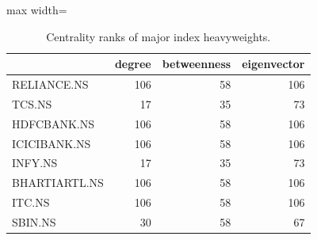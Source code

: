\begin{table}
\centering
\caption{Centrality ranks of major index heavyweights.}
\label{tab:heavyweights}
\begin{adjustbox}{max width=\textwidth}
\begin{tabular}{lrrr}
\toprule
 & degree & betweenness & eigenvector \\
\midrule
RELIANCE.NS & 106 & 58 & 106 \\
TCS.NS & 17 & 35 & 73 \\
HDFCBANK.NS & 106 & 58 & 106 \\
ICICIBANK.NS & 106 & 58 & 106 \\
INFY.NS & 17 & 35 & 73 \\
BHARTIARTL.NS & 106 & 58 & 106 \\
ITC.NS & 106 & 58 & 106 \\
SBIN.NS & 30 & 58 & 67 \\
\bottomrule
\end{tabular}
\end{adjustbox}
\end{table}
